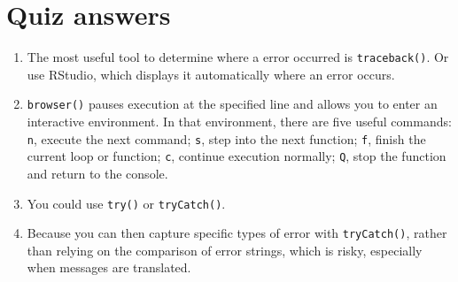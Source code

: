 \begin{itemize}
\begin{Shaded}
\begin{Highlighting}[]
\StringTok{ }
\StringTok{ }
  \NormalTok{(}\NormalTok{(}\NormalTok{, n), x[}\OperatorTok{-}\StringTok{ }\NormalTok{n)])}
\NormalTok{\}}
\end{Highlighting}
\end{Shaded}
\end{itemize}

\hypertarget{debugging-answers}{%
\section{Quiz answers}\label{debugging-answers}}

\begin{enumerate}
\def\labelenumi{\arabic{enumi}.}
\item
  The most useful tool to determine where a error occurred is
  \texttt{traceback()}. Or use RStudio, which displays it automatically
  where an error occurs.
\item
  \texttt{browser()} pauses execution at the specified line and allows
  you to enter an interactive environment. In that environment, there
  are five useful commands: \texttt{n}, execute the next command;
  \texttt{s}, step into the next function; \texttt{f}, finish the
  current loop or function; \texttt{c}, continue execution normally;
  \texttt{Q}, stop the function and return to the console.
\item
  You could use \texttt{try()} or \texttt{tryCatch()}.
\item
  Because you can then capture specific types of error with
  \texttt{tryCatch()}, rather than relying on the comparison of error
  strings, which is risky, especially when messages are translated.
\end{enumerate}
